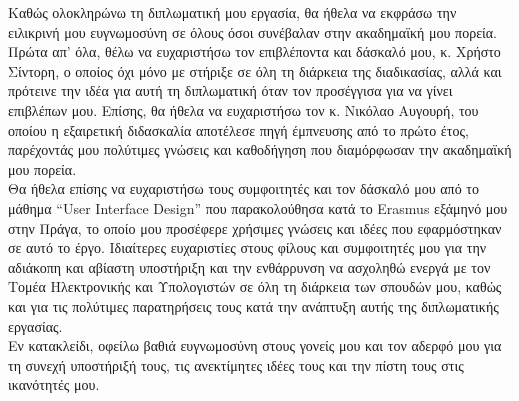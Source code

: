 \noindent Καθώς ολοκληρώνω τη διπλωματική μου εργασία, θα ήθελα να εκφράσω την ειλικρινή μου ευγνωμοσύνη σε όλους όσοι συνέβαλαν στην ακαδημαϊκή μου πορεία.\vspace{3mm} \\
Πρώτα απ' όλα, θέλω να ευχαριστήσω τον επιβλέποντα και δάσκαλό μου, κ. Χρήστο Σίντορη, ο οποίος όχι μόνο με στήριξε σε όλη τη διάρκεια της διαδικασίας, αλλά και πρότεινε την ιδέα για αυτή τη διπλωματική όταν τον προσέγγισα για να γίνει επιβλέπων μου. Επίσης, θα ήθελα να ευχαριστήσω τον κ. Νικόλαο Αυγουρή, του οποίου η εξαιρετική διδασκαλία αποτέλεσε πηγή έμπνευσης από το πρώτο έτος, παρέχοντάς μου πολύτιμες γνώσεις και καθοδήγηση που διαμόρφωσαν την ακαδημαϊκή μου πορεία.\vspace{3mm} \\
Θα ήθελα επίσης να ευχαριστήσω τους συμφοιτητές και τον δάσκαλό μου από το μάθημα ``User Interface Design'' που παρακολούθησα κατά το Erasmus εξάμηνό μου στην Πράγα, το οποίο μου προσέφερε χρήσιμες γνώσεις και ιδέες που εφαρμόστηκαν σε αυτό το έργο. Ιδιαίτερες ευχαριστίες στους φίλους και συμφοιτητές μου για την αδιάκοπη και αβίαστη υποστήριξη και την ενθάρρυνση να ασχοληθώ ενεργά με τον Τομέα Ηλεκτρονικής και Υπολογιστών σε όλη τη διάρκεια των σπουδών μου, καθώς και για τις πολύτιμες παρατηρήσεις τους κατά την ανάπτυξη αυτής της διπλωματικής εργασίας.\vspace{3mm} \\
Εν κατακλείδι, οφείλω βαθιά ευγνωμοσύνη στους γονείς μου και τον αδερφό μου για τη συνεχή υποστήριξή τους, τις ανεκτίμητες ιδέες τους και την πίστη τους στις ικανότητές μου.

\clearpage
\myemptypage
\thispagestyle{empty}